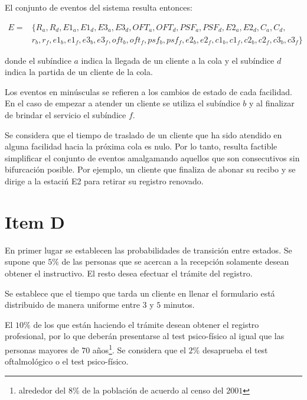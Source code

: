 \documentclass[a4paper,10pt]{article}
\begin{document}
El conjunto de eventos del sistema resulta entonces:

\begin{equation*}
\begin{split}
E = & \{R_a, R_d, E1_a, E1_d, E3_a, E3_d, OFT_a, OFT_d, PSF_a, PSF_d,
 E2_a, E2_d, C_a, C_d, \\
 & r_b, r_f, e1_b, e1_f, e3_b, e3_f, oft_b, oft_f,
 psf_b, psf_f, e2_b, e2_f, c1_b, c1_f, c2_b, c2_f, c3_b, c3_f \}
\end{split}
\end{equation*}


donde el sub\'indice $a$ indica la llegada de un cliente a la cola y el
sub\'indice $d$ indica la partida de un cliente de la cola.


Los eventos en min\'usculas se refieren a los cambios de estado de cada facilidad.
En el caso de empezar a atender un cliente se utiliza el sub\'indice $b$ y 
al finalizar de brindar el servicio el sub\'indice $f$.


Se considera que el tiempo de traslado de un cliente que ha sido atendido en
alguna facilidad hacia la pr\'oxima cola es nulo. Por lo tanto, resulta factible
simplificar el conjunto de eventos amalgamando aquellos que son
consecutivos sin bifurcaci\'{o}n posible. Por ejemplo, un cliente que finaliza
de abonar su recibo y se dirige a la estaci\'n E2 para retirar su registro
renovado.

\section*{Item D}

En primer lugar se establecen las probabilidades de transici\'on entre estados.
Se supone que $5\%$ de las personas que se acercan a la recepci\'on solamente
desean obtener el instructivo. El resto desea efectuar el tr\'amite del
registro.


Se establece que el tiempo que tarda un cliente en llenar el formulario est\'a
distribuido de manera uniforme entre $3$ y $5$ minutos.


El $10\%$ de los que est\'an haciendo el tr\'amite
desean obtener el registro profesional, por lo que deber\'an presentarse
al test psico-f\'isico al igual que las personas mayores de $70$ a\~nos\footnote{alrededor del $8\%$ de la poblaci\'on de acuerdo al censo del $2001$}.
Se considera que el $2\%$ desaprueba el test oftalmol\'ogico
o el test psico-f\'isico. 
\end{document}
